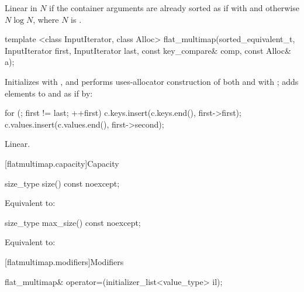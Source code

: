 \begin{codeblock}
\begin{codeblock}
\begin{codeblock}
\begin{addedblock}
\begin{itemdescr}
\pnum
\complexity
Linear in $N$ if the container arguments are already sorted as if with
 and otherwise $N \log N$, where $N$ is
.
\end{itemdescr}

%
\begin{itemdecl}
template <class InputIterator, class Alloc>
  flat_multimap(sorted_equivalent_t, InputIterator first, InputIterator last,
                const key_compare& comp, const Alloc& a);
\end{itemdecl}

\begin{itemdescr}
\pnum
\effects Initializes  with , and performs
uses-allocator construction of both
 and  with ; adds elements to
 and  as if by:
\begin{codeblock}
for (; first != last; ++first) {
  c.keys.insert(c.keys.end(), first->first);
  c.values.insert(c.values.end(), first->second);
}
\end{codeblock}

\pnum
\complexity
Linear.
\end{itemdescr}

[flatmultimap.capacity]{Capacity}

%
\begin{itemdecl}
size_type size() const noexcept;
\end{itemdecl}

\begin{itemdescr}
\pnum
\effects
Equivalent to: 
\end{itemdescr}

%
\begin{itemdecl}
size_type max_size() const noexcept;
\end{itemdecl}

\begin{itemdescr}
\pnum
\effects
Equivalent to: 
\end{itemdescr}

[flatmultimap.modifiers]{Modifiers}

%
\begin{itemdecl}
flat_multimap& operator=(initializer_list<value_type> il);
\end{itemdecl}


\end{addedblock}
\end{codeblock}
\end{codeblock}
\end{codeblock}
